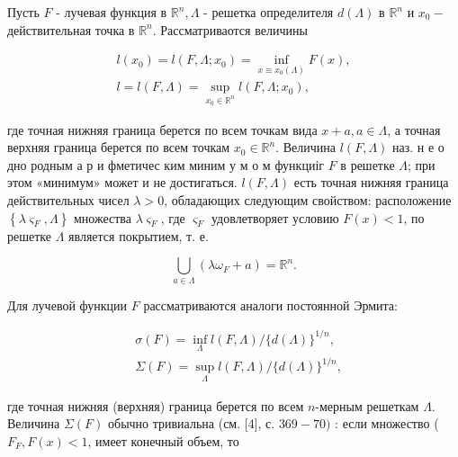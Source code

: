 \documentclass[10pt]{article}
\begin{document}
Пусть $F$ - лучевая функция в $\mathbb{R}^{n}, \Lambda$ - решетка определителя $d(\Lambda)$ в $\mathbb{R}^{n}$ и $x_{0}-$ действительная точка в $\mathbb{R}^{n}$. Рассматриваотся величины



\[

\begin{gathered}

l\left(x_{0}\right)=l\left(F, \Lambda ; x_{0}\right)=\inf _{x \equiv x_{0}(\Lambda)} F(x), \\

l=l(F, \Lambda)=\sup _{x_{0} \in \mathbb{R}^{n}} l\left(F, \Lambda ; x_{0}\right),

\end{gathered}

\]



где точная нижняя граница берется по всем точкам вида $x+a, a \in \Lambda$, а точная верхняя граница берется по всем точкам $x_{0} \in \mathbb{R}^{n}$. Величина $l(F, \Lambda)$ наз. н е о дно родным а р и фметичес ким миним у м о м функциіг $F$ в решетке $\Lambda$; при этом «минимум» может и не достигаться. $l(F, \Lambda)$ есть точная нижняя граница действительных чисел $\lambda>0$, обладающих следующим свойством: расположение $\left\{\lambda \varsigma_{F}, \Lambda\right\}$ множества $\lambda \varsigma_{F}$, где $\varsigma_{F}$ удовлетворяет условию $F(x)<1$, по решетке $\Lambda$ является покрытием, т. е.



\[

\bigcup_{a \in \Lambda}\left(\lambda \omega_{F}+a\right)=\mathbb{R}^{n} .

\]



Для лучевой функции $F$ рассматриваются аналоги постоянной Эрмита:



\[

\begin{aligned}

& \sigma(F)=\inf _{\Lambda} l(F, \Lambda) /\{d(\Lambda)\}^{1 / n}, \\

& \Sigma(F)=\sup _{\Lambda} l(F, \Lambda) /\{d(\Lambda)\}^{1 / n},

\end{aligned}

\]



где точная нижняя (верхняя) граница берется по всем $n$-мерным решеткам $\Lambda$. Величина $\Sigma(F)$ обычно тривиальна (см. [4], с. $369-70)$ : если множество ( $F_{F}, F(x)<1$, имеет конечный объем, то
\end{document}
